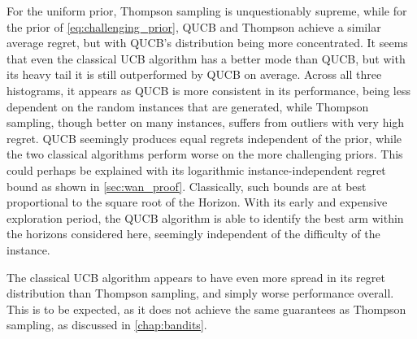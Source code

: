 For the uniform prior, Thompson sampling is unquestionably supreme, while for the prior of \cref{eq:challenging_prior}, QUCB and Thompson achieve a similar average regret, but with QUCB's distribution being more concentrated.
It seems that even the classical UCB algorithm has a better mode than QUCB, but with its heavy tail it is still outperformed by QUCB on average.
Across all three histograms, it appears as QUCB is more consistent in its performance, being less dependent on the random instances that are generated, while Thompson sampling, though better on many instances, suffers from outliers with very high regret.
QUCB seemingly produces equal regrets independent of the prior, while the two classical algorithms perform worse on the more challenging priors.
This could perhaps be explained with its logarithmic instance-independent regret bound as shown in \cref{sec:wan_proof}.
Classically, such bounds are at best proportional to the square root of the Horizon.
With its early and expensive exploration period, the QUCB algorithm is able to identify the best arm within the horizons considered here, seemingly independent of the difficulty of the instance.

The classical UCB algorithm appears to have even more spread in its regret distribution than Thompson sampling, and simply worse performance overall.
This is to be expected, as it does not achieve the same guarantees as Thompson sampling, as discussed in \cref{chap:bandits}.





